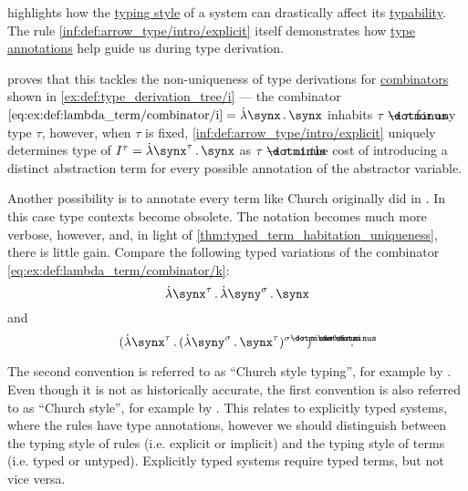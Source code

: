 \begin{remark}\label{rem:typing_style}
   highlights how the \hyperref[def:simple_type_system_style]{typing style} of a system can drastically affect its \hyperref[def:typability]{typability}. The rule \ref{inf:def:arrow_type/intro/explicit} itself demonstrates how \hyperref[con:type_annotation]{type annotations} help guide us during type derivation.

   proves that this tackles the non-uniqueness of type derivations for \hyperref[def:lambda_combinator]{combinators} shown in \cref{ex:def:type_derivation_tree/i} --- the combinator \( \ref{eq:ex:def:lambda_term/combinator/i} = \qabs \synx \synx \) inhabits \( \tau \synimplies \tau \) for any type \( \tau \), however, when \( \tau \) is fixed, \ref{inf:def:arrow_type/intro/explicit} uniquely determines  type of \( I^\tau = \qabs {\synx^\tau} \synx \) as \( \tau \synimplies \tau \) at the cost of introducing a distinct abstraction term for every possible annotation of the abstractor variable.

  Another possibility is to annotate every term like Church originally did in \cite{Church1940STT}. In this case type contexts become obsolete. The notation becomes much more verbose, however, and, in light of \cref{thm:typed_term_habitation_uniqueness}, there is little gain. Compare the following typed variations of the combinator \ref{eq:ex:def:lambda_term/combinator/k}:
  \begin{equation*}
    \qabs {\synx^\tau} \qabs {\syny^\sigma} \synx
  \end{equation*}
  and
  \begin{equation*}
    (\qabs {\synx^\tau} (\qabs {\syny^\sigma} \synx^\tau)^{\sigma \synimplies \tau})^{\tau \synimplies \sigma \synimplies \tau}.
  \end{equation*}

  The second convention is referred to as \enquote{Church style typing}, for example by \cite[ch. 5]{Hindley1997BasicSTT}. Even though it is not as historically accurate, the first convention is also referred to as \enquote{Church style}, for example by . This relates to explicitly typed systems, where the rules have type annotations, however we should distinguish between the typing style of rules (i.e. explicit or implicit) and the typing style of terms (i.e. typed or untyped). Explicitly typed systems require typed terms, but not vice versa.


\end{remark}
